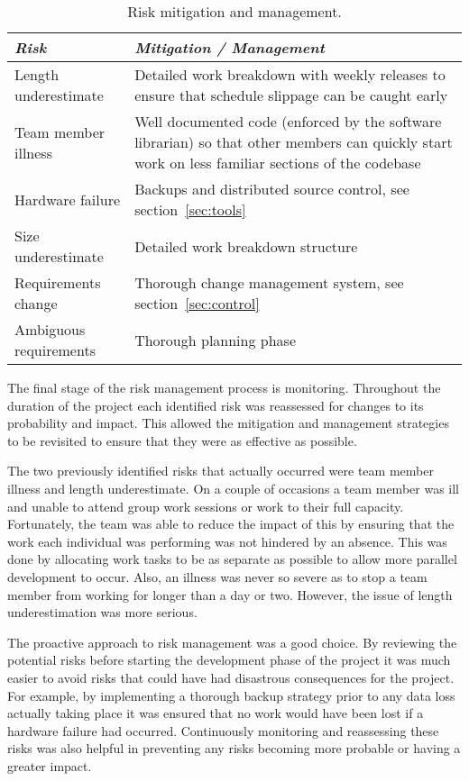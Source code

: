 \begin{table*}
	\small
	\begin{tabular}{l p{37em}}
		\toprule
		\emph{Risk} & \emph{Mitigation / Management} \\
		\midrule
		Length underestimate & Detailed work breakdown with weekly releases to ensure that
			schedule slippage can be caught early \\
		Team member illness & Well documented code (enforced by the software librarian) so
			that other members can quickly start work on less familiar sections of
			the codebase \\
		Hardware failure & Backups and distributed source control, see section~\ref{sec:tools} \\
		Size underestimate & Detailed work breakdown structure \\
		Requirements change & Thorough change management system, see section~\ref{sec:control} \\
		Ambiguous requirements & Thorough planning phase \\
		\bottomrule
	\end{tabular}
	\vspace{1.5em}
	\caption[Risk mitigation and management]{Risk mitigation and management.}
	\label{tab:rmm}
\end{table*}
 
The final stage of the risk management process is monitoring. Throughout the duration of
the project each identified risk was reassessed for changes to its probability and
impact. This allowed the mitigation and management strategies to be revisited to ensure that
they were as effective as possible.
 
The two previously identified risks that actually occurred were team member illness and length underestimate.
On a couple of occasions a team member was ill and unable to attend group work sessions or work to their full
capacity. Fortunately, the team was able to reduce the impact of this by ensuring that the work each individual
was performing was not hindered by an absence. This was done by allocating work tasks to be as separate as
possible to allow more parallel development to occur. Also, an illness was never so severe as to stop a team
member from working for longer than a day or two. However, the issue of length underestimation was more serious.
 
%
 
The proactive approach to risk management was a good choice. By reviewing the potential
risks before starting the development phase of the project it was much easier to avoid risks that could
have had disastrous consequences for the project. For example, by implementing a thorough backup strategy
prior to any data loss actually taking place it was ensured that no work would have been lost if a hardware
failure had occurred. Continuously monitoring and reassessing these risks was also helpful in preventing
any risks becoming more probable or having a greater impact.

